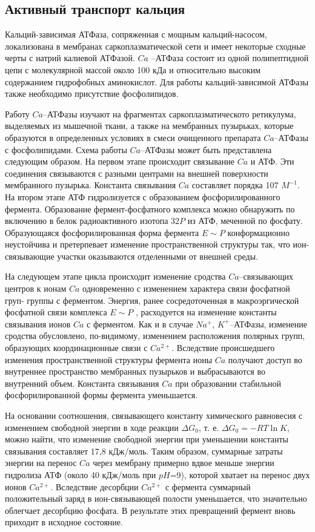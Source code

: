 \documentclass[12pt,a4paper,oneside]{book}
\begin{document}
\subsection{Активный транспорт кальция}

Кальций-зависимая АТФаза, сопряженная с мощным кальций-насосом, локализована в мембранах саркоплазматической сети и имеет некоторые сходные черты с натрий калиевой АТФазой. $Ca$ --АТФаза состоит из одной полипептидной цепи с молекулярной массой около 100 кДа и относительно высоким содержанием гидрофобных аминокислот. Для работы кальций-зависимой АТФазы также необходимо присутствие фосфолипидов.

Работу $Ca$--АТФазы изучают на фрагментах саркоплазматическото ретикулума, выделяемых из мышечной ткани, а также на мембранных пузырьках, которые образуются в определенных условиях в смеси очищенного препарата $Ca$--АТФазы с фосфолипидами. Схема работы $Ca$--АТФазы может быть представлена следующим образом. На первом этапе происходит связывание $Ca$ и АТФ. Эти соединения связываются с разными центрами на внешней поверхности мембранного пузырька. Константа связывания $Ca$ составляет порядка 107 $M^{-1}$. На втором этапе АТФ гидролизуется с образованием фосфорилированного фермента. Образование фермент-фосфатного комплекса можно обнаружить по включению в белок радиоактивного изотопа $32P$ из АТФ, меченной по фосфату. Образующаяся фосфорилированная форма фермента $E \sim P$ конформационно неустойчива и претерпевает изменение пространственной структуры так, что ион-связывающие участки оказываются отделенными от внешней среды. 

На следующем этапе цикла происходит изменение сродства $Ca$--связывающих центров к ионам $Ca$ одновременно с изменением характера связи фосфатной груп- группы с ферментом. Энергия, ранее сосредоточенная в макроэргической фосфатной связи комплекса $E \sim P$ , расходуется на изменение константы связывания ионов $Ca$ с ферментом. Как и в случае $Na^+$, $K^+$--АТФазы, изменение сродства обусловлено, по-видимому, изменением расположения полярных групп, образующих координационные связи с $Ca^{2+}$. Вследствие происшедшего изменения пространственной структуры фермента ионы $Ca$ получают доступ во внутреннее пространство мембранных пузырьков и выбрасываются во внутренний объем. Константа связывания $Ca$ при образовании стабильной фосфорилированной формы фермента уменьшается.

На основании соотношения, связывающего константу химического равновесия с изменением свободной энергии в ходе реакции $\Delta G_0$, т. е. $\Delta G_0 = -RT \ln K$, можно найти, что изменение свободной энергии при уменьшении константы связывания составляет 17,8 кДж/моль. Таким образом, суммарные затраты энергии на перенос $Ca$ через мембрану примерно вдвое меньше энергии гидролиза АТФ (около 40 кДж/моль при $pH$=9), которой хватает на перенос двух ионов $Ca^{2+}$. Вследствие десорбции $Ca^{2+}$ с фермента суммарный положительный заряд в ион-связывающей полости уменьшается, что значительно облегчает десорбцию фосфата. В результате этих превращений фермент вновь приходит в исходное состояние.
\end{document}
